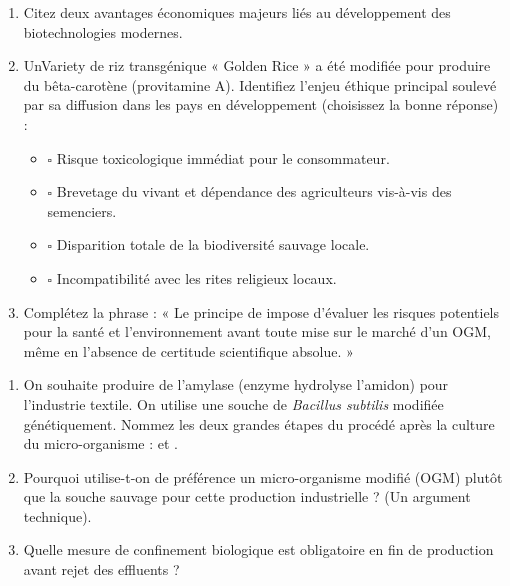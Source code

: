 \documentclass[11pt]{article}
\begin{document}
\begin{exercice}
\begin{enumerate}
    \item Citez deux avantages économiques majeurs liés au développement des biotechnologies modernes.
    \item UnVariety de riz transgénique « Golden Rice » a été modifiée pour produire du bêta-carotène (provitamine A). Identifiez l'enjeu éthique principal soulevé par sa diffusion dans les pays en développement (choisissez la bonne réponse) :
    \begin{itemize}
        \item[] $\square$ Risque toxicologique immédiat pour le consommateur.
        \item[] $\square$ Brevetage du vivant et dépendance des agriculteurs vis-à-vis des semenciers.
        \item[] $\square$ Disparition totale de la biodiversité sauvage locale.
        \item[] $\square$ Incompatibilité avec les rites religieux locaux.
    \end{itemize}
    \item Complétez la phrase : « Le principe de \underline{\hspace{4cm}} impose d'évaluer les risques potentiels pour la santé et l'environnement avant toute mise sur le marché d'un OGM, même en l'absence de certitude scientifique absolue. »
\end{enumerate}
\end{exercice}

\begin{exercice}
\begin{enumerate}
    \item On souhaite produire de l'amylase (enzyme hydrolyse l'amidon) pour l'industrie textile. On utilise une souche de \textit{Bacillus subtilis} modifiée génétiquement. Nommez les deux grandes étapes du procédé après la culture du micro-organisme : \underline{\hspace{3cm}} et \underline{\hspace{3cm}}.
    \item Pourquoi utilise-t-on de préférence un micro-organisme modifié (OGM) plutôt que la souche sauvage pour cette production industrielle ? (Un argument technique).
    \item Quelle mesure de confinement biologique est obligatoire en fin de production avant rejet des effluents ?
\end{enumerate}
\end{exercice}
\end{document}

